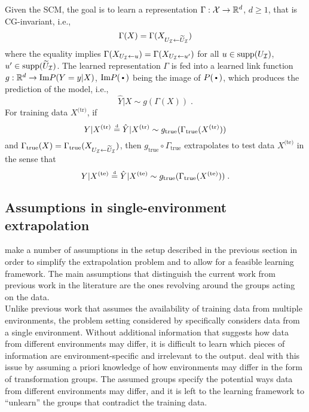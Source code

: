 Given the SCM, the goal is to learn a representation $\Gamma:\mathcal{X}\rightarrow\mathbb{R}^d$, $d\geq 1$, that is CG-invariant, i.e.,
\[
\Gamma(X) = \Gamma(X_{U_{\mathcal{I}}\leftarrow\widetilde{U}_{\mathcal{I}}})
\]
where the equality implies $\Gamma(X_{U_{\mathcal{I}}\leftarrow u})=\Gamma(X_{U_{\mathcal{I}}\leftarrow u'})$ for all $u\in\text{\rm supp}(U_{\mathcal{I}})$, $u'\in\text{\rm supp}(\widetilde{U}_{\mathcal{I}})$. The learned representation $\Gamma$ is fed into a learned link function $g:\mathbb{R}^d\rightarrow \text{Im} P(Y=y|X)$, $\text{Im} P(\argdot)$ being the image of $P(\argdot)$, which produces the prediction of the model, i.e.,
\[
\hat{Y}|X \sim g(\Gamma(X)) \;.
\]
For training data $X^\text{(tr)}$, if
\[
Y|X^\text{(tr)} \stackrel{\text{\rm\tiny d}}{=} \hat{Y}|X^\text{(tr)}\sim g_{\text{true}}(\Gamma_{\text{true}}(X^\text{(tr)}))
\]
and $\Gamma_\text{true}(X) = \Gamma_\text{true}(X_{U_{\mathcal{I}}\leftarrow\widetilde{U}_{\mathcal{I}}})$, then $g_\text{true}\circ\Gamma_\text{true}$ extrapolates to test data $X^\text{(te)}$ in the sense that
\[
Y|X^\text{(te)} \stackrel{\text{\rm\tiny d}}{=} \hat{Y}|X^\text{(te)}\sim g_{\text{true}}(\Gamma_{\text{true}}(X^\text{(te)})) \;.
\]


\subsection{Assumptions in single-environment extrapolation}

\textcite{Mouli:2021} make a number of assumptions in the setup described in the previous section in order to simplify the extrapolation problem and to allow for a feasible learning framework. The main assumptions that distinguish the current work from previous work in the literature are the ones revolving around the groups acting on the data.
\\

Unlike previous work that assumes the availability of training data from multiple environments, the problem setting considered by \citeauthor{Mouli:2021} specifically considers data from a single environment. Without additional information that suggests how data from different environments may differ, it is difficult to learn which pieces of information are environment-specific and irrelevant to the output. \citeauthor{Mouli:2021} deal with this issue by assuming a priori knowledge of how environments may differ in the form of transformation groups. The assumed groups specify the potential ways data from different environments may differ, and it is left to the learning framework to ``unlearn'' the groups that contradict the training data.
\\

